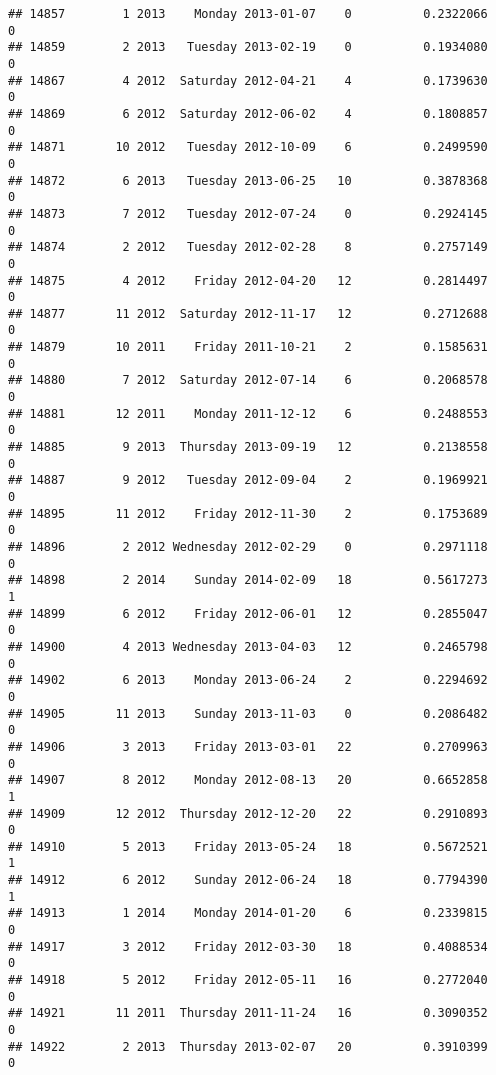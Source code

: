 \documentclass[
]{article}
\begin{document}
\begin{verbatim}
## 14857        1 2013    Monday 2013-01-07    0          0.2322066             0
## 14859        2 2013   Tuesday 2013-02-19    0          0.1934080             0
## 14867        4 2012  Saturday 2012-04-21    4          0.1739630             0
## 14869        6 2012  Saturday 2012-06-02    4          0.1808857             0
## 14871       10 2012   Tuesday 2012-10-09    6          0.2499590             0
## 14872        6 2013   Tuesday 2013-06-25   10          0.3878368             0
## 14873        7 2012   Tuesday 2012-07-24    0          0.2924145             0
## 14874        2 2012   Tuesday 2012-02-28    8          0.2757149             0
## 14875        4 2012    Friday 2012-04-20   12          0.2814497             0
## 14877       11 2012  Saturday 2012-11-17   12          0.2712688             0
## 14879       10 2011    Friday 2011-10-21    2          0.1585631             0
## 14880        7 2012  Saturday 2012-07-14    6          0.2068578             0
## 14881       12 2011    Monday 2011-12-12    6          0.2488553             0
## 14885        9 2013  Thursday 2013-09-19   12          0.2138558             0
## 14887        9 2012   Tuesday 2012-09-04    2          0.1969921             0
## 14895       11 2012    Friday 2012-11-30    2          0.1753689             0
## 14896        2 2012 Wednesday 2012-02-29    0          0.2971118             0
## 14898        2 2014    Sunday 2014-02-09   18          0.5617273             1
## 14899        6 2012    Friday 2012-06-01   12          0.2855047             0
## 14900        4 2013 Wednesday 2013-04-03   12          0.2465798             0
## 14902        6 2013    Monday 2013-06-24    2          0.2294692             0
## 14905       11 2013    Sunday 2013-11-03    0          0.2086482             0
## 14906        3 2013    Friday 2013-03-01   22          0.2709963             0
## 14907        8 2012    Monday 2012-08-13   20          0.6652858             1
## 14909       12 2012  Thursday 2012-12-20   22          0.2910893             0
## 14910        5 2013    Friday 2013-05-24   18          0.5672521             1
## 14912        6 2012    Sunday 2012-06-24   18          0.7794390             1
## 14913        1 2014    Monday 2014-01-20    6          0.2339815             0
## 14917        3 2012    Friday 2012-03-30   18          0.4088534             0
## 14918        5 2012    Friday 2012-05-11   16          0.2772040             0
## 14921       11 2011  Thursday 2011-11-24   16          0.3090352             0
## 14922        2 2013  Thursday 2013-02-07   20          0.3910399             0

\end{verbatim}
\end{document}
